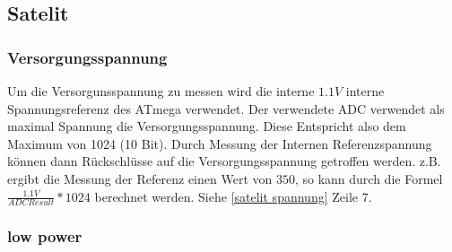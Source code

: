 \subsection{Satelit}

\subsubsection{Versorgungsspannung}
Um die Versorgunsspannung zu messen wird die interne $1.1V$ interne Spannungsreferenz des ATmega verwendet. Der verwendete ADC verwendet als maximal Spannung die Versorgungsspannung. Diese Entspricht also dem Maximum von 1024 (10 Bit). Durch Messung der Internen Referenzspannung können dann Rückschlüsse auf die Versorgungsspannung getroffen werden. 
z.B. ergibt die Messung der Referenz einen Wert von $350$, so kann durch die Formel $\frac{1.1V}{ADC Result} * 1024$ berechnet werden. Siehe \ref{satelit spannung} Zeile 7.
\subsubsection{low power}
